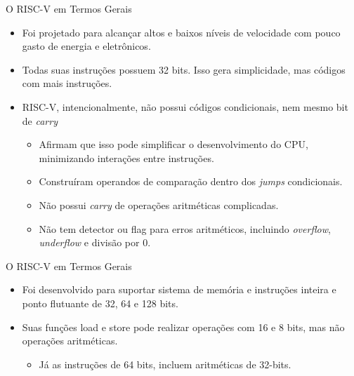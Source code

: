 \documentclass[aspectratio=169]{beamer}
\begin{document}
\begin{frame}{O RISC-V em Termos Gerais}
	\begin{itemize}
		\item Foi projetado para alcançar altos e baixos níveis de velocidade com pouco gasto de energia e eletrônicos.

		\item Todas suas instruções possuem 32 bits. Isso gera simplicidade, mas códigos com mais instruções.

		\item RISC-V, intencionalmente, não possui códigos condicionais, nem mesmo bit de \textit{carry}
		\begin{itemize}
			\item Afirmam que isso pode simplificar o desenvolvimento do CPU, minimizando interações entre instruções.
			\item Construíram operandos de comparação dentro dos \textit{jumps} condicionais.
			\item Não possui \textit{carry} de operações aritméticas complicadas.
			\item Não tem detector ou flag para erros aritméticos, incluindo \textit{overflow}, \textit{underflow} e divisão por 0.
		\end{itemize}
	\end{itemize}
\end{frame}

\begin{frame}{O RISC-V em Termos Gerais}
	\begin{itemize}
		\item Foi desenvolvido para suportar sistema de memória e instruções inteira e ponto flutuante de 32, 64 e 128 bits.

		\item Suas funções load e store pode realizar operações com 16 e 8 bits, mas não operações aritméticas.
		\begin{itemize}
			\item Já as instruções de 64 bits, incluem aritméticas de 32-bits.
		\end{itemize}
	\end{itemize}
\end{frame}
\end{document}
